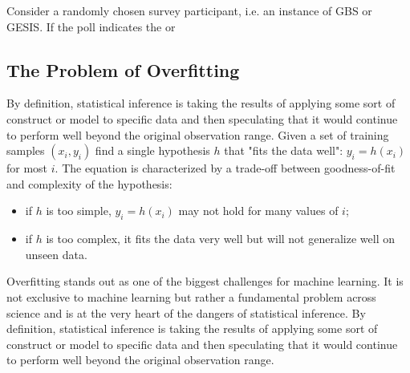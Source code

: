 Consider a randomly chosen survey participant, i.e. an instance of GBS or GESIS. If the poll indicates the or

\subsection{The Problem of Overfitting}

By deﬁnition, statistical inference is taking the results of applying some sort of construct or model to speciﬁc data and then speculating that it would continue to perform well beyond the original observation range. Given a set of training samples \((x_i,y_i)\) ﬁnd a single hypothesis \(h\) that "fits the data well": \(y_i = h(x_i)\) for most \(i\). The equation is characterized by a trade-off between goodness-of-ﬁt and complexity of the hypothesis:

\begin{itemize}
\item if \(h\) is too simple, \(y_i = h(x_i)\) may not hold for many values of \(i\);
\item if \(h\) is too complex, it fits the data very well but will not generalize well on unseen data.
\end{itemize}

Overﬁtting stands out as one of the biggest challenges for machine learning. It is not exclusive to machine learning but rather a fundamental problem across science and is at the very heart of the dangers of statistical inference. By deﬁnition, statistical inference is taking the results of applying some sort of construct or model to speciﬁc data and then speculating that it would continue to perform well beyond the original observation range.
